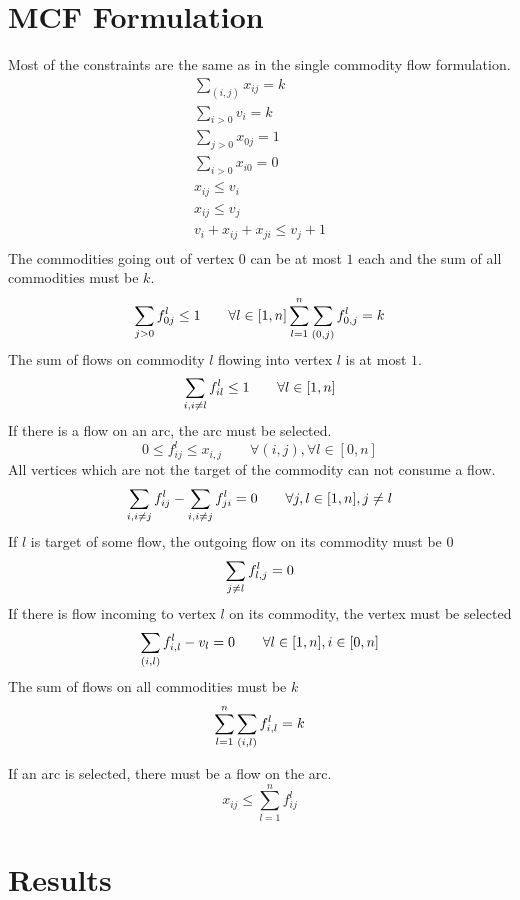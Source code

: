 \documentclass[a4paper]{article}
\numberwithin{equation}{section}
\begin{document}
\section{MCF Formulation}
Most of the constraints are the same as in the single commodity flow formulation.
\begin{align}
	\sum_{(i,j)} x_{ij} = k\\
	\sum_{i>0}v_i =k \\
	\sum_{j>0} x_{0j}=1\\
	\sum_{i>0} x_{i0}=0\\
	x_{ij} \leq v_i\\
	x_{ij} \leq v_j\\
	v_i + x_{ij} + x_{ji} \leq v_j + 1\\
\end{align}
The commodities going out of vertex $0$ can be at most $1$ each and the sum of all commodities must be $k$.
\begin{equation}
	\sum_{j>0} f_{0j}^l \leq 1 \qquad \forall l\in [1,n]\\
	\sum_{l=1}^n \sum_{(0,j)} f_{0,j}^l = k\\
\end{equation}
The sum of flows on commodity $l$ flowing into vertex $l$ is at most $1$.
\begin{equation}
\sum_{i,i\not =l} f_{il}^l \leq 1 \qquad \forall l\in [1,n]\\
\end{equation}
If there is a flow on an arc, the arc must be selected.
\begin{equation}
0\leq f_{ij}^l \leq x_{i,j} \qquad \forall (i,j), \forall l \in [0,n]
\end{equation}
All vertices which are not the target of the commodity can not consume a flow.
\begin{equation}
\sum_{i,i\not = j}f_{ij}^l - \sum_{i,i\not = j} f_{ji}^l =0 \qquad \forall j, l\in [1,n], j\not =l \\
\end{equation}
If $l$ is target of some flow, the outgoing flow on its commodity must be $0$
\begin{equation}
\sum_{j\not=l} f_{l,j}^l =0\\
\end{equation}
If there is flow incoming to vertex $l$ on its commodity, the vertex must be selected
\begin{equation}
\sum_{(i,l)} f_{i,l}^l - v_l=0 \qquad \forall l\in [1,n], i\in[0,n]\\
\end{equation}
The sum of flows on all commodities must be $k$
\begin{equation}
	\sum_{l=1}^n \sum_{(i,l)} f_{i,l}^l = k\\
\end{equation}

If an arc is selected, there must be a flow on the arc.
\begin{equation}
x_{ij} \leq \sum_{l=1}^n f_{ij}^l
\end{equation}

\section{Results}

\end{document}
